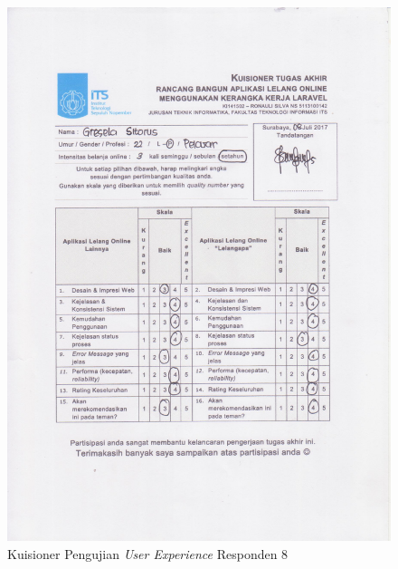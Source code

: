 \begin{figure}[H]
	\centering
	\includegraphics[width=.9\textwidth]{images/bab5/ujipengguna/8.jpg}
	\caption{Kuisioner Pengujian \textit{User Experience} Responden 8}
	\label{quest-8}
\end{figure}
